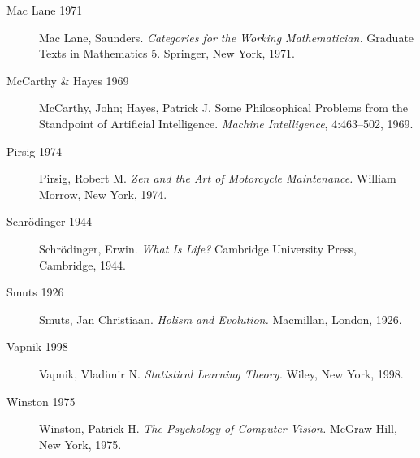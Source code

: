 \documentclass[12pt, a4paper, oneside]{book}
\begin{document}
\begin{description}
\item[Mac Lane 1971] Mac Lane, Saunders.
  \textit{Categories for the Working Mathematician.}
  Graduate Texts in Mathematics 5. Springer, New York, 1971.

\item[McCarthy \& Hayes 1969] McCarthy, John; Hayes, Patrick J\@.
  Some Philosophical Problems from the Standpoint of Artificial Intelligence.
  \textit{Machine Intelligence}, 4:463--502, 1969.

\item[Pirsig 1974] Pirsig, Robert M\@.
  \textit{Zen and the Art of Motorcycle Maintenance.}
  William Morrow, New York, 1974.

\item[Schr\"{o}dinger 1944] Schr\"{o}dinger, Erwin.
  \textit{What Is Life?}
  Cambridge University Press, Cambridge, 1944.

\item[Smuts 1926] Smuts, Jan Christiaan.
  \textit{Holism and Evolution.}
  Macmillan, London, 1926.

\item[Vapnik 1998] Vapnik, Vladimir N\@.
  \textit{Statistical Learning Theory.}
  Wiley, New York, 1998.

\item[Winston 1975] Winston, Patrick H\@.
  \textit{The Psychology of Computer Vision.}
  McGraw-Hill, New York, 1975.

\end{description}
\end{document}
